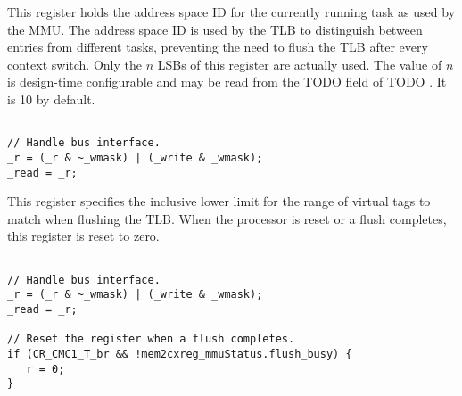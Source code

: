 
This register holds the address space ID for the currently running task as used
by the MMU. The address space ID is used by the TLB to distinguish between
entries from different tasks, preventing the need to flush the TLB after every
context switch. Only the $n$ LSBs of this register are actually used. The value
of $n$ is design-time configurable and may be read from the TODO field of TODO
. It is 10 by default.

\declaration{}
\implementation{}
\begin{lstlisting}

// Handle bus interface.
_r = (_r & ~_wmask) | (_write & _wmask);
_read = _r;

\end{lstlisting}


This register specifies the inclusive lower limit for the range of virtual tags 
to match when flushing the TLB. When the processor is reset or a flush 
completes, this register is reset to zero.

\declaration{}
\implementation{}
\begin{lstlisting}

// Handle bus interface.
_r = (_r & ~_wmask) | (_write & _wmask);
_read = _r;

// Reset the register when a flush completes.
if (CR_CMC1_T_br && !mem2cxreg_mmuStatus.flush_busy) {
  _r = 0;
}

\end{lstlisting}


